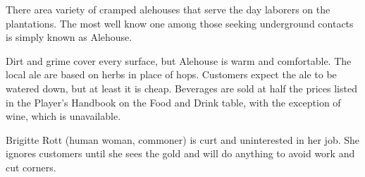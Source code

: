 There area variety of cramped alehouses that serve the day laborers on the plantations.
The most well know one among those seeking underground contacts is simply known as Alehouse.

Dirt and grime cover every surface, but Alehouse is warm and comfortable.
The local ale are based on herbs in place of hops.
Customers expect the ale to be watered down, but at least it is cheap.
Beverages are sold at half the prices listed in the Player's Handbook on the Food and Drink table, with the exception of wine, which is unavailable.

Brigitte Rott (human woman, commoner) is curt and uninterested in her job.
She ignores customers until she sees the gold and will do anything to avoid work and cut corners.
